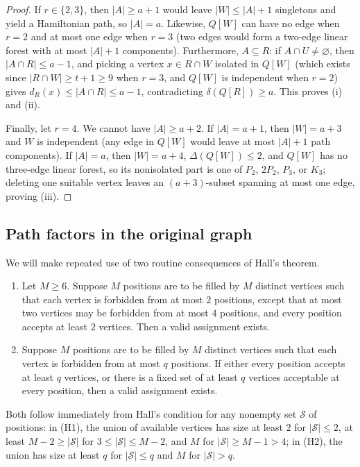 \documentclass[10pt]{article}
\theoremstyle{compactplain}
\theoremstyle{remark}\newtheorem{remark}[theorem]{Remark}
\begin{document}
\begin{proof}
If $r\in\{2,3\}$, then $|A|\ge a+1$ would leave $|W|\le|A|+1$ singletons
and yield a Hamiltonian path, so $|A|=a$. Likewise, $Q[W]$ can have no
edge when $r=2$ and at most one edge when $r=3$ (two edges would form a
two-edge linear forest with at most $|A|+1$ components). Furthermore,
$A\subseteq R$: if $A\cap U\ne\varnothing$, then $|A\cap R|\le a-1$, and
picking a vertex $x\in R\cap W$ isolated in $Q[W]$ (which exists since
$|R\cap W|\ge t+1\ge9$ when $r=3$, and $Q[W]$ is independent when $r=2$)
gives $d_R(x)\le|A\cap R|\le a-1$, contradicting $\delta(Q[R])\ge a$.
This proves (i) and (ii).

Finally, let $r=4$. We cannot have $|A|\ge a+2$. If $|A|=a+1$, then
$|W|=a+3$ and $W$ is independent (any edge in $Q[W]$ would leave at most
$|A|+1$ path components). If $|A|=a$, then $|W|=a+4$,
$\Delta(Q[W])\le2$, and $Q[W]$ has no three-edge linear forest, so its
nonisolated part is one of $P_2$, $2P_2$, $P_3$, or $K_3$; deleting one
suitable vertex leaves an $(a+3)$-subset spanning at most one edge,
proving (iii).
\end{proof}

\subsection{Path factors in the original graph}

We will make repeated use of two routine consequences of Hall's theorem.
\begin{enumerate}
\item[(H1)] Let $M\ge6$. Suppose $M$ positions are to be filled by $M$
distinct vertices such that each vertex is forbidden from at most $2$
positions, except that at most two vertices may be forbidden from at
most $4$ positions, and every position accepts at least $2$ vertices.
Then a valid assignment exists.
\item[(H2)] Suppose $M$ positions are to be filled by $M$ distinct
vertices such that each vertex is forbidden from at most $q$ positions.
If either every position accepts at least $q$ vertices, or there is a
fixed set of at least $q$ vertices acceptable at every position, then a
valid assignment exists.
\end{enumerate}
Both follow immediately from Hall's condition for any nonempty set
$\mathcal{S}$ of positions: in (H1), the union of available vertices has
size at least $2$ for $|\mathcal{S}|\le2$, at least $M-2\ge|\mathcal{S}|$
for $3\le|\mathcal{S}|\le M-2$, and $M$ for $|\mathcal{S}|\ge M-1>4$; in
(H2), the union has size at least $q$ for $|\mathcal{S}|\le q$ and $M$
for $|\mathcal{S}|>q$.
\end{document}
